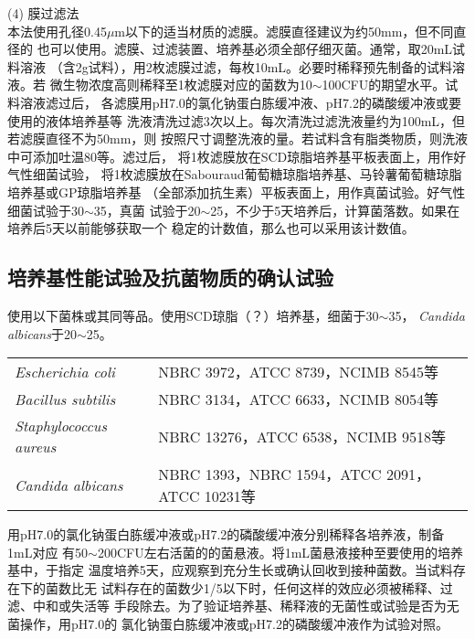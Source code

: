 \documentclass[11pt,a4paper]{article}
\newenvironment{SC}{%
  \CJKfamily{gbsn}%
  \CJKtilde
  \CJKnospace}{}
\begin{document}
\begin{CJK}{UTF8}{}
\begin{SC}
(4) 膜过滤法 \\
本法使用孔径0.45$\mu$m以下的适当材质的滤膜。滤膜直径建议为约50mm，但不同直径的
也可以使用。滤膜、过滤装置、培养基必须全部仔细灭菌。通常，取20mL试料溶液
（含2g试料），用2枚滤膜过滤，每枚10mL。必要时稀释预先制备的试料溶液。若
微生物浓度高则稀释至1枚滤膜对应的菌数为10$\sim$100CFU的期望水平。试料溶液滤过后，
各滤膜用pH7.0的氯化钠蛋白胨缓冲液、pH7.2的磷酸缓冲液或要使用的液体培养基等
洗液清洗过滤3次以上。每次清洗过滤洗液量约为100mL，但若滤膜直径不为50mm，则
按照尺寸调整洗液的量。若试料含有脂类物质，则洗液中可添加吐温80等。滤过后，
将1枚滤膜放在SCD琼脂培养基平板表面上，用作好气性细菌试验，
将1枚滤膜放在Sabouraud葡萄糖琼脂培养基、马铃薯葡萄糖琼脂培养基或GP琼脂培养基
（全部添加抗生素）平板表面上，用作真菌试验。好气性细菌试验于30$\sim$35\textcelsius，真菌
试验于20$\sim$25\textcelsius，不少于5天培养后，计算菌落数。如果在培养后5天以前能够获取一个
稳定的计数值，那么也可以采用该计数值。\\

\subsection*{培养基性能试验及抗菌物质的确认试验}
使用以下菌株或其同等品。使用SCD琼脂（？）培养基，细菌于30$\sim$35\textcelsius，
\textsl{Candida albicans}于20$\sim$25。
\begin{center}
\begin{tabular}{ll}
\textsl{Escherichia coli}	&NBRC 3972，ATCC 8739，NCIMB 8545等\\
\textsl{Bacillus subtilis}	&NBRC 3134，ATCC 6633，NCIMB 8054等\\
\textsl{Staphylococcus aureus}	&NBRC 13276，ATCC 6538，NCIMB 9518等\\
\textsl{Candida albicans}	&NBRC 1393，NBRC 1594，ATCC 2091，ATCC 10231等\\
\end{tabular}
\end{center}
用pH7.0的氯化钠蛋白胨缓冲液或pH7.2的磷酸缓冲液分别稀释各培养液，制备1mL对应
有50$\sim$200CFU左右活菌的的菌悬液。将1mL菌悬液接种至要使用的培养基中，于指定
温度培养5天，应观察到充分生长或确认回收到接种菌数。当试料存在下的菌数比无
试料存在的菌数少1/5以下时，任何这样的效应必须被稀释、过滤、中和或失活等
手段除去。为了验证培养基、稀释液的无菌性或试验是否为无菌操作，用pH7.0的
氯化钠蛋白胨缓冲液或pH7.2的磷酸缓冲液作为试验对照。\\


\end{SC}
\end{CJK}
\end{document}
